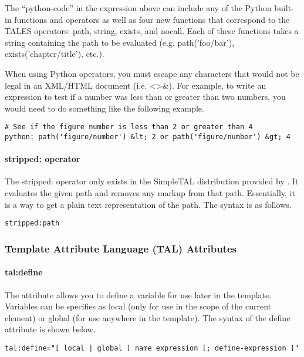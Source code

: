 The ``python-code'' in the expression above can include any of the Python
built-in functions and operators as well as four new functions that
correspond to the TALES operators: path, string, exists, and nocall.
Each of these functions takes a string containing the path to be 
evaluated (e.g. path('foo/bar'), exists('chapter/title'), etc.).

When using Python operators, you must escape any characters that would
not be legal in an XML/HTML document (i.e. <>\&).  For example, 
to write an expression to test if a number was less than or greater than
two numbers, you would need to do something like the following example.
\begin{verbatim}
# See if the figure number is less than 2 or greater than 4
python: path('figure/number') &lt; 2 or path('figure/number') &gt; 4
\end{verbatim}


\paragraph{stripped: operator}

The stripped: operator only exists in the SimpleTAL distribution provided
by \plasTeX.  It evaluates the given path and removes any markup from
that path.  Essentially, it is a way to get a plain text representation
of the path.  The syntax is as follows.
\begin{verbatim}
stripped:path
\end{verbatim}


\subsubsection{Template Attribute Language (TAL) Attributes\label{sec:talattributes}}

\paragraph{tal:define}

The  attribute allows you to define a variable for use
later in the template.  Variables can be specifies as local (only for
use in the scope of the current element) or global (for use anywhere in
the template).  The syntax of the define attribute is shown below.
\begin{verbatim}
tal:define="[ local | global ] name expression [; define-expression ]"
\end{verbatim}

